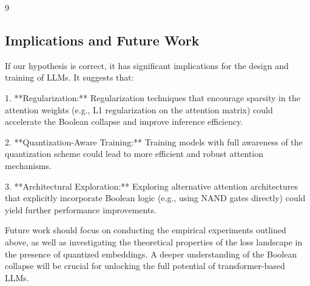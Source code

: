 \documentclass[11pt]{article}
\theoremstyle{definition}
\begin{document}
\begin{thebibliography}{9}
\subsection{Implications and Future Work}













If our hypothesis is correct, it has significant implications for the design and training of LLMs.  It suggests that:













1.  **Regularization:**  Regularization techniques that encourage sparsity in the attention weights (e.g., L1 regularization on the attention matrix) could accelerate the Boolean collapse and improve inference efficiency.






2.  **Quantization-Aware Training:**  Training models with full awareness of the quantization scheme could lead to more efficient and robust attention mechanisms.






3.  **Architectural Exploration:**  Exploring alternative attention architectures that explicitly incorporate Boolean logic (e.g., using NAND gates directly) could yield further performance improvements.













Future work should focus on conducting the empirical experiments outlined above, as well as investigating the theoretical properties of the loss landscape in the presence of quantized embeddings.  A deeper understanding of the Boolean collapse will be crucial for unlocking the full potential of transformer-based LLMs.














\end{thebibliography}
\end{document}

